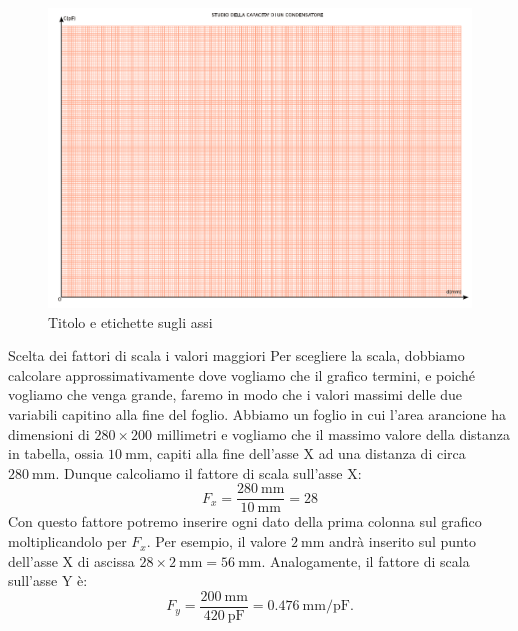 \documentclass[12pt,a4paper,oneside]{book}
\makeatletter
\renewcommand{\subsection}{\@startsection {subsection}{2}{\z@}
{-3ex \@plus -0.1ex \@minus -.4ex}
{0.5ex \@plus.2ex }
{\color[rgb]{0.141,0.596,0.749}\normalfont\sffamily\bfseries}}
\theoremstyle{esercizio}
\makeatother
\begin{document}
   \begin{figure}[h!]
    \centering
    \includegraphics[width=\linewidth]{path_to_image/titoloassi.pdf} 
    \caption{Titolo e  etichette sugli assi}
    \label{fig:titoloassi}
\end{figure}  

\subsection{Scelta dei fattori di scala i valori maggiori} 
Per scegliere la scala, dobbiamo calcolare approssimativamente dove vogliamo che il grafico termini, e poiché vogliamo che venga grande, faremo in modo che i valori massimi delle due variabili capitino alla fine del foglio. Abbiamo un foglio in cui l'area arancione ha   dimensioni di $280 \times 200 $ millimetri e vogliamo che il massimo valore della distanza in tabella, ossia $\SI{10}{\milli\meter}$, capiti alla fine dell'asse X ad una distanza di circa $\SI{280}{\milli\meter}$. Dunque calcoliamo il fattore di scala sull'asse X:
\[
F_x=\frac{\SI{280}{\milli\meter}}{\SI{10}{\milli\meter}} = 28
\]
Con questo fattore potremo inserire ogni dato della prima colonna sul grafico moltiplicandolo per $F_x$. Per esempio, il valore $\SI{2}{\milli\meter}$ andrà inserito sul punto dell'asse X di ascissa $28\times\SI{2}{\milli\meter} = \SI{56}{\milli\meter}$. Analogamente, il fattore di scala sull'asse Y è:
\[
F_y = \frac{\SI{200}{\milli\meter}}{\SI{420}{\pico\farad}} = \SI{0,476}{\milli\meter\per\pico\farad}.
\] 
\end{document}

